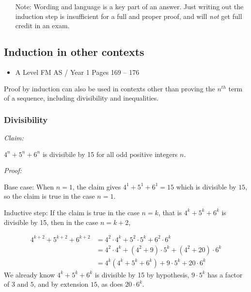 \documentclass[11pt, a4paper]{article}
\begin{document}
\begin{itemize}
\item[Note:] Wording and language is a key part of an answer. Just writing out the induction step is insufficient for a full and proper proof, and will \emph{not} get full credit in an exam.
\end{itemize}

\vspace{0.5cm}


\subsection{Induction in other contexts}
\begin{itemize}
\item A Level FM AS / Year 1 \hspace{1cm} Pages 169 -- 176
\end{itemize} \par
Proof by induction can also be used in contexts other than proving the $n^{th}$ term of a sequence, including divisibility and inequalities.
\subsubsection*{Divisibility}
\noindent\emph{Claim:} \newline \par
$4^{n}+5^{n}+6^{n}$ is divisibile by 15 for all odd positive integers $n$. \newline \par
\noindent\emph{Proof:} \newline \par
Base case: When $n=1$, the claim gives $4^{1}+5^{1}+6^{1}=15$ which is divisible by $15$, so the claim is true in the case $n=1$. \newline \par

Inductive step: If the claim is true in the case $n=k$, that is $4^{k}+5^{k}+6^{k}$ is divisible by 15, then in the case $n=k+2$, \par
\begin{align*}
4^{k+2}+5^{k+2}+6^{k+2}&=4^{2}\cdot4^{k}+5^{2}\cdot5^{k}+6^{2}\cdot6^{k} \\
&=4^{2}\cdot4^{k}+\left( 4^{2}+9 \right)\cdot5^{k}+\left( 4^{2}+20 \right)\cdot6^{k} \\
&=4^{k}\left( 4^{k}+5^{k}+6^{k} \right)+9\cdot5^{k}+20\cdot6^{k}
\end{align*}
We already know $4^{k}+5^{k}+6^{k}$ is divisible by 15 by hypothesis, $9\cdot5^{k}$ has a factor of $3$ and $5$, and by extension $15$, as does $20\cdot6^{k}$. \newline \par
\end{document}
